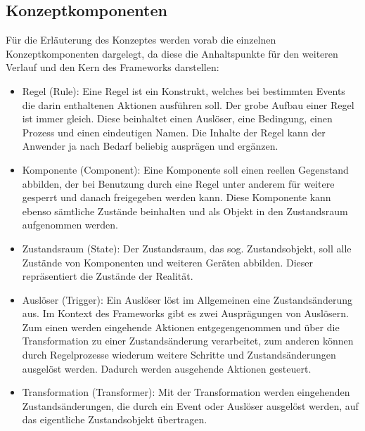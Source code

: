     \subsection{Konzeptkomponenten}
    \label{subsec:conceptcomps}
        Für die Erläuterung des Konzeptes werden vorab die einzelnen Konzeptkomponenten dargelegt, da diese die Anhaltspunkte 
        für den weiteren Verlauf und den Kern des Frameworks darstellen: %
        \begin{itemize} 
            \item Regel (Rule): Eine Regel ist ein Konstrukt, welches bei bestimmten Events die darin enthaltenen Aktionen ausführen soll. 
            Der grobe Aufbau einer Regel ist immer gleich. Diese beinhaltet einen Auslöser, eine Bedingung, einen Prozess und einen eindeutigen 
            Namen. Die Inhalte der Regel kann der Anwender ja nach Bedarf beliebig ausprägen und ergänzen. 
            \item Komponente (Component): Eine Komponente soll einen reellen Gegenstand abbilden, der bei Benutzung durch eine Regel unter anderem 
            für weitere gesperrt und danach freigegeben werden kann. Diese Komponente kann ebenso sämtliche Zustände beinhalten und als Objekt in den Zustandsraum aufgenommen werden.
            \item Zustandsraum (State): Der Zustandsraum, das sog. Zustandsobjekt, soll alle Zustände von Komponenten und weiteren Geräten abbilden. Dieser repräsentiert die Zustände der Realität.
            \item Auslöser (Trigger): Ein Auslöser löst im Allgemeinen eine Zustandsänderung aus. Im Kontext des Frameworks gibt es zwei Ausprägungen von 
            Auslösern. Zum einen werden eingehende Aktionen entgegengenommen und über die Transformation zu einer Zustandsänderung verarbeitet, zum anderen können durch Regelprozesse 
            wiederum weitere Schritte und Zustandsänderungen ausgelöst werden. Dadurch werden ausgehende Aktionen gesteuert. 
            \item Transformation (Transformer): Mit der Transformation werden eingehenden Zustandsänderungen, die durch ein Event oder Auslöser ausgelöst werden, 
            auf das eigentliche Zustandsobjekt übertragen. 
        \end{itemize}
